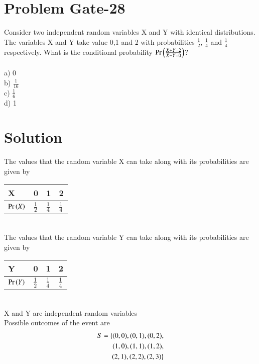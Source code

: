 \documentclass[journal,12pt,twocolumn]{IEEEtran}
\begin{document}
\section*{Problem Gate-28}
Consider two independent random variables X and Y with identical distributions. The variables X and Y take value 0,1 and 2 with probabilities $\frac{1}{2}$, $\frac{1}{4}$ and $\frac{1}{4}$ respectively. What is the conditional probability $\Pr\left(\frac{X+Y=2}{X-Y=0}\right)$?\\\\
a) 0\\
b) $\frac{1}{16}$\\
c) $\frac{1}{6}$\\
d) 1
\section*{Solution}
The values that the random variable X can take along with its probabilities are given by\\
\begin{table}[h]
\centering
\begin{tabular}{|l|l|l|l|}
\hline
X             & 0             & 1             & 2             \\ \hline
$\Pr\left(X\right)$ & $\frac{1}{2}$ & $\frac{1}{4}$ & $\frac{1}{4}$ \\ \hline
\end{tabular}
\end{table}
\\
The values that the random variable Y can take along with its probabilities are given by\\
\begin{table}[h]
\centering
\begin{tabular}{|l|l|l|l|}
\hline
Y             & 0             & 1             & 2             \\ \hline
$\Pr\left(Y\right)$ & $\frac{1}{2}$ & $\frac{1}{4}$ & $\frac{1}{4}$ \\ \hline
\end{tabular}
\end{table}
\\
X and Y are independent random variables\\
Possible outcomes of the event are\\
\begin{align}
S=\{(0,0),(0,1),(0,2),\notag\\(1,0),(1,1),(1,2),\notag\\(2,1),(2,2),(2,3)\}
\end{align}
\end{document}
